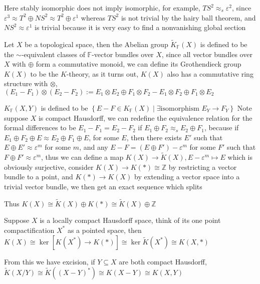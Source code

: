 \documentclass[../main.tex]{subfiles}
\begin{document}
\begin{remark}
Here stably isomorphic does not imply isomorphic, for example, $TS^2\approx_s\varepsilon^2$, since $\varepsilon^3\approx T^2\oplus NS^2\approx T^2\oplus\varepsilon^1$ whereas $TS^2$ is not trivial by the hairy ball theorem, and $NS^2\approx\varepsilon^1$ is trivial because it is very easy to find a nonvanishing global section
\end{remark}

\begin{definition}\label{Topologcial $K$-theory}
Let $X$ be a topological space, then the Abelian group $\tilde{K}_{\mathbb F}(X)$ is defined to be the $\sim$-equivalent classes of $\mathbb F$-vector bundles over $X$, since all vector bundles over $X$ with $\oplus$ form a commutative monoid, we can define its Grothendieck group $K(X)$ to be the $K$-theory, as it turns out, $K(X)$ also has a commutative ring structure with $\otimes$, $(E_1-F_1)\otimes (E_2-F_2):=E_1\otimes E_2\oplus F_1\otimes F_2-E_1\otimes F_2\oplus F_1\otimes E_2$ \par
$K_{\mathbb F}(X,Y)$ is defined to be $\left\{E-F\in K_{\mathbb F}(X)\middle|\exists\text{isomorphism }E_Y\to F_Y\right\}$
Note suppose $X$ is compact Hausdorff, we can redefine the equivalence relation for the formal differences to be $E_1-F_1=E_2-F_2$ if $E_1\oplus F_2\approx_s E_2\oplus F_1$, because if $E_1\oplus F_2\oplus E\approx E_2\oplus F_1\oplus E$, for some $E$, then there exists $E'$ such that $E\oplus E'\approx\varepsilon^m$ for some $m$, and any $E-F=(E\oplus F')-\varepsilon^m$ for some $F'$ such that $F\oplus F'\approx\varepsilon^m$, thus we can define a map $K(X)\to\tilde{K}(X), E-\varepsilon^m\mapsto E$ which is obviously surjective, consider $K(X)\to K(*)\cong\mathbb Z$ by restricting a vector bundle to a point, and $K(*)\to K(X)$ by extending a vector space into a trivial vector bundle, we then get an exact sequence which splits \par
{}
Thus $K(X)\cong\tilde{K}(X)\oplus K(*)\cong\tilde{K}(X)\oplus\mathbb Z$ \par
Suppose $X$ is a locally compact Hausdorff space, think of its one point compactification $X^*$ as a pointed space, then $K(X)\cong\ker\left[K(X^*)\to K(*)\right]\cong\ker \tilde{K}(X^*)\cong K(X,*)$ \par
From this we have excision, if $Y\subseteq X$ are both compact Hausdorff, $\tilde{K}(X/Y)\cong\tilde{K}((X-Y)^*)\cong K(X-Y)\cong K(X,Y)$ 
\end{definition}
\end{document}
